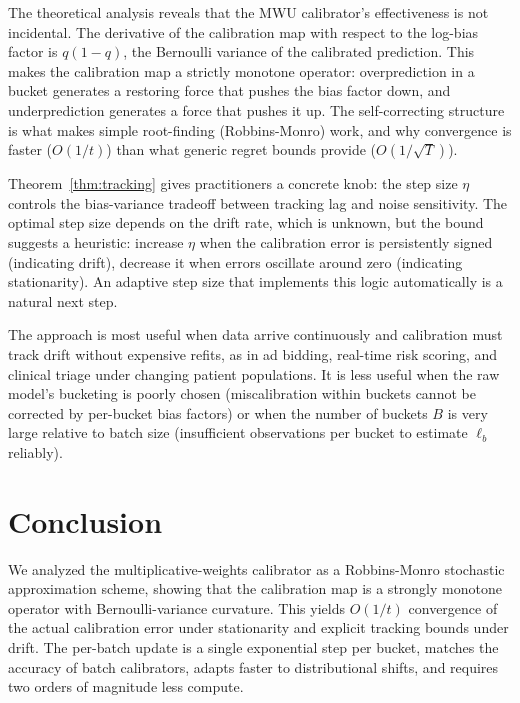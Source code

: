 \documentclass[12pt, letterpaper]{article}
\theoremstyle{definition}
\theoremstyle{remark}
\begin{document}
The theoretical analysis reveals that the MWU calibrator's effectiveness is not incidental. The derivative of the calibration map with respect to the log-bias factor is $q(1-q)$, the Bernoulli variance of the calibrated prediction. This makes the calibration map a strictly monotone operator: overprediction in a bucket generates a restoring force that pushes the bias factor down, and underprediction generates a force that pushes it up. The self-correcting structure is what makes simple root-finding (Robbins-Monro) work, and why convergence is faster ($O(1/t)$) than what generic regret bounds provide ($O(1/\sqrt{T})$).

Theorem~\ref{thm:tracking} gives practitioners a concrete knob: the step size $\eta$ controls the bias-variance tradeoff between tracking lag and noise sensitivity. The optimal step size depends on the drift rate, which is unknown, but the bound suggests a heuristic: increase $\eta$ when the calibration error is persistently signed (indicating drift), decrease it when errors oscillate around zero (indicating stationarity). An adaptive step size that implements this logic automatically is a natural next step.

The approach is most useful when data arrive continuously and calibration must track drift without expensive refits, as in ad bidding, real-time risk scoring, and clinical triage under changing patient populations. It is less useful when the raw model's bucketing is poorly chosen (miscalibration within buckets cannot be corrected by per-bucket bias factors) or when the number of buckets $B$ is very large relative to batch size (insufficient observations per bucket to estimate $\ell_b$ reliably).

\section{Conclusion}
\label{sec:conclusion}

We analyzed the multiplicative-weights calibrator as a Robbins-Monro stochastic approximation scheme, showing that the calibration map is a strongly monotone operator with Bernoulli-variance curvature. This yields $O(1/t)$ convergence of the actual calibration error under stationarity and explicit tracking bounds under drift. The per-batch update is a single exponential step per bucket, matches the accuracy of batch calibrators, adapts faster to distributional shifts, and requires two orders of magnitude less compute.



\end{document}
